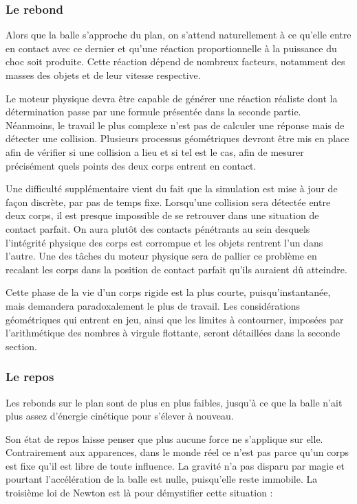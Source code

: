 \subsubsection{Le rebond}

Alors que la balle s'approche du plan, on s'attend
naturellement à ce qu'elle entre en contact avec ce dernier et qu'une
réaction proportionnelle à la puissance du choc soit produite. Cette
réaction dépend de nombreux facteurs, notamment des masses des objets
et de leur vitesse respective.

Le moteur physique devra être capable de générer une réaction réaliste
dont la détermination passe par une formule présentée dans la seconde
partie. Néanmoins, le travail le plus complexe n'est pas de calculer
une réponse mais de détecter une collision. Plusieurs processus
géométriques devront être mis en place afin de vérifier si une
collision a lieu et si tel est le cas, afin de mesurer précisément
quels points des deux corps entrent en contact.

Une difficulté supplémentaire vient du fait que la simulation est mise
à jour de façon discrète, par pas de temps fixe. Lorsqu'une collision
sera détectée entre deux corps, il est presque impossible de se
retrouver dans une situation de contact parfait. On aura plutôt des
contacts pénétrants au sein desquels l'intégrité physique des corps
est corrompue et les objets rentrent l'un dans l'autre. Une des tâches
du moteur physique sera de pallier ce problème en recalant les corps
dans la position de contact parfait qu'ils auraient dû atteindre.

Cette phase de la vie d'un corps rigide est la plus courte,
puisqu'instantanée, mais demandera paradoxalement le plus de
travail. Les considérations géométriques qui entrent en jeu, ainsi que
les limites à contourner, imposées par l'arithmétique des nombres à
virgule flottante, seront détaillées dans la seconde section.

\subsubsection{Le repos}

Les rebonds sur le plan sont de plus en plus faibles, jusqu'à ce que
la balle n'ait plus assez d'énergie cinétique pour s'élever à
nouveau.

Son état de repos laisse penser que plus aucune force ne s'applique
sur elle. Contrairement aux apparences, dans le monde réel ce n'est
pas parce qu'un corps est fixe qu'il est libre de toute influence. La
gravité n'a pas disparu par magie et pourtant l'accélération de la
balle est nulle, puisqu'elle reste immobile. La troisième loi de Newton
est là pour démystifier cette situation :

